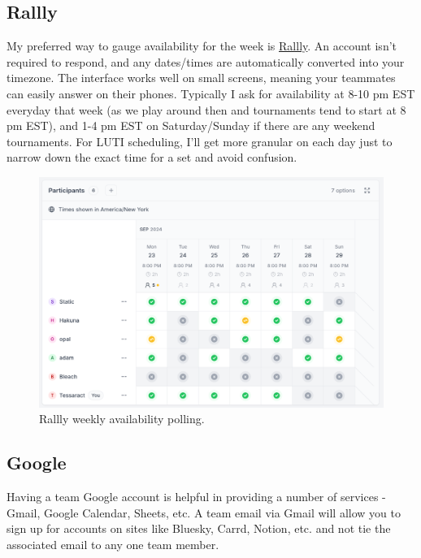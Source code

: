 \documentclass[12pt]{article}
\begin{document}
\subsection{Rallly}
My preferred way to gauge availability for the week is \href{https://rallly.co}{Rallly}. An account isn't required to respond, and any dates/times are automatically converted into your timezone. The interface works well on small screens, meaning your teammates can easily answer on their phones. Typically I ask for availability at 8-10 pm EST everyday that week (as we play around then and tournaments tend to start at 8 pm EST), and 1-4 pm EST on Saturday/Sunday if there are any weekend tournaments. For LUTI scheduling, I'll get more granular on each day just to narrow down the exact time for a set and avoid confusion.
\begin{figure}
    \centering
    \includegraphics[width=0.8\linewidth]{rallly.png}
\caption{Rallly weekly availability polling.}
\end{figure}

\subsection{Google}
Having a team Google account is helpful in providing a number of services - Gmail, Google Calendar, Sheets, etc. A team email via Gmail will allow you to sign up for accounts on sites like Bluesky, Carrd, Notion, etc. and not tie the associated email to any one team member. 
\end{document}
